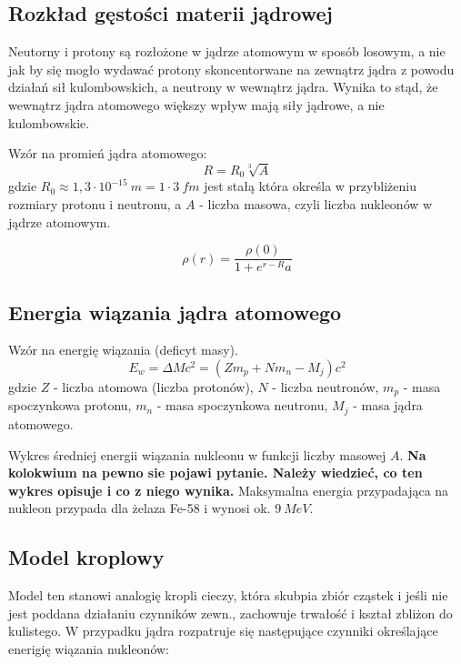 \documentclass{article}
\begin{document}
\subsection{Rozkład gęstości materii jądrowej}
Neutorny i protony są rozłożone w jądrze atomowym w sposób losowym, a nie jak by się mogło wydawać protony skoncentorwane na zewnątrz jądra z powodu działań sił kulombowskich, a neutrony w wewnątrz jądra. Wynika to stąd, że wewnątrz jądra atomowego większy wpływ mają siły jądrowe, a nie kulombowskie.

Wzór na promień jądra atomowego:
\begin{equation}
    R = R_0 \sqrt[3]{A}
\end{equation}
gdzie $R_0 \approx 1,3\cdot 10^{-15}~m = 1 \cdot 3~fm$ jest stałą która określa w przybliżeniu rozmiary protonu i neutronu, a $A$ - liczba masowa, czyli liczba nukleonów w jądrze atomowym.

\begin{equation}
    \rho (r) = \frac{\rho (0)}{1 + e^{r-R}a}
\end{equation}

\subsection{Energia wiązania jądra atomowego}

Wzór na energię wiązania (deficyt masy).
\begin{equation}
    E_w = \Delta Mc^2 = (Zm_p+Nm_n-M_j)c^2
\end{equation}
gdzie $Z$ - liczba atomowa (liczba protonów), $N$ - liczba neutronów, $m_p$ - masa spoczynkowa protonu, $m_n$ - masa spoczynkowa neutronu, $M_j$ - masa jądra atomowego.

Wykres średniej energii wiązania nukleonu w funkcji liczby masowej $A$. \textbf{Na kolokwium na pewno sie pojawi pytanie. Należy wiedzieć, co ten wykres opisuje i co z niego wynika.}
Maksymalna energia przypadająca na nukleon przypada dla żelaza Fe-58 i wynosi ok. $9~MeV$.

\subsection{Model kroplowy}
Model ten stanowi analogię kropli cieczy, która skubpia zbiór cząstek i jeśli nie jest poddana działaniu czynników zewn., zachowuje trwałość i kształ zbliżon do kulistego. W przypadku jądra rozpatruje się następujące czynniki określające enerigię wiązania nukleonów:
\end{document}
